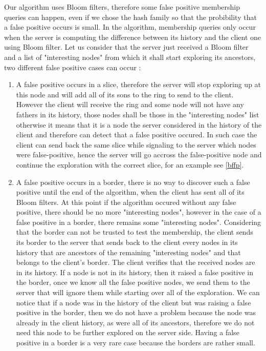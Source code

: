 Our algorithm uses Bloom filters, therefore some false positive membership queries can happen, even if we chose the hash family so that the probibility that a false positive occurs is small. In the algorithm, membership queries only occur when the server is computing the difference between its history and the client one using Bloom filter. Let us consider that the server just received a Bloom filter and a list of "interesting nodes" from which it shall start exploring its ancestors, two different false positive cases can occur :
\begin{enumerate}
 \item A false positive occurs in a slice, therefore the server will stop exploring up at this node and will add all of its sons to the ring to send to the client. However the client will receive the ring and some node will not have any fathers in its history, those nodes shall be those in the "interesting nodes" list otherwise it means that it is a node the server considered in the history of the client and therefore can detect that a false positive occured. In such case the client can send back the same slice while signaling to the server which nodes were false-positive, hence the server will go accross the false-positive node and continue the exploration with the correct slice, for an example see \ref{bffp}.
 \item A false positive occurs in a border, there is no way to discover such a false positive until the end of the algorithm, when the client has sent all of its Bloom filters. At this point if the algorithm occured without any false positive, there should be no more "interesting nodes", however in the case of a false positive in a border, there remains some "interesting nodes". Considering that the border can not be trusted to test the membership, the client sends its border to the server that sends back to the client every nodes in its history that are ancestors of the remaining "interesting nodes" and that belongs to the client's border. The client verifies that the received nodes are in its history. If a node is not in its history, then it raised a false positive in the border, once we know all the false positive nodes, we send them to the server that will ignore them while starting over all of the exploration. We can notice that if a node was in the history of the client but was raising a false positive 
in the border, then we do not have a problem because the node was already in the client history, as were all of its ancestors, therefore we do not need this node to be further explored on the server side. Having a false positive in a border is a very rare case because the borders are rather small.
\end{enumerate}
